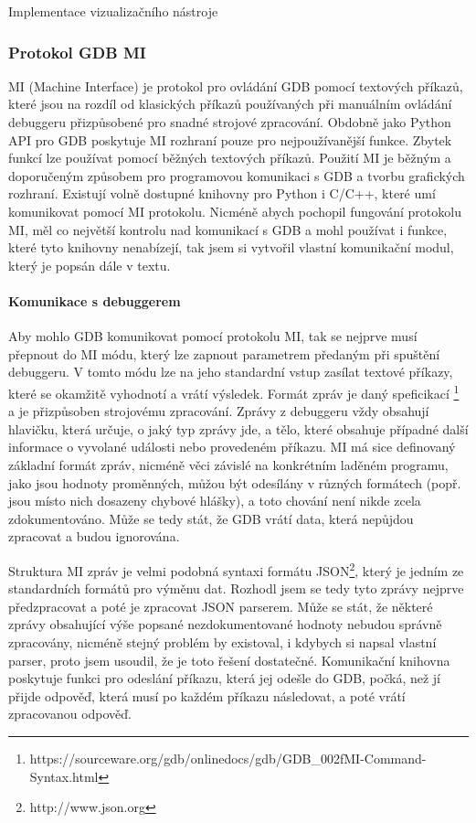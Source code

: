 \documentclass[czech,bachelor,male,python,dept460,hidelinks]{diploma}						%
\newcommand{\parspace}[1][]{
	\ifthenelse{\isempty{#1}}{\vspace{5mm}}{\vspace{#1}}
	\par
}
\begin{document}
\begin{section}{Implementace vizualizačního nástroje}
		\subsubsection{Protokol GDB MI}
		MI (Machine Interface) je protokol pro ovládání GDB pomocí textových příkazů, které jsou na rozdíl od klasických příkazů používaných při manuálním
		ovládání debuggeru přizpůsobené pro snadné strojové zpracování. Obdobně jako Python API pro GDB poskytuje MI rozhraní pouze pro nejpoužívanější funkce.
		Zbytek funkcí lze používat pomocí běžných textových příkazů. Použití MI je běžným a doporučeným \cite{gdb-mi-usage} způsobem pro programovou komunikaci
		s GDB a tvorbu grafických rozhraní. Existují volně dostupné knihovny pro Python i C/C++, které umí komunikovat pomocí MI protokolu.
		Nicméně abych pochopil fungování protokolu MI, měl co největší kontrolu nad komunikací s GDB a mohl používat i funkce, které tyto knihovny nenabízejí, tak
		jsem si vytvořil vlastní komunikační modul, který je popsán dále v textu.
		
		\paragraph*{Komunikace s debuggerem}
			Aby mohlo GDB komunikovat pomocí protokolu MI, tak se nejprve musí přepnout do MI módu, který lze zapnout parametrem předaným při spuštění debuggeru.
			V tomto módu lze na jeho standardní vstup zasílat textové příkazy, které se okamžitě vyhodnotí a vrátí výsledek. Formát zpráv je daný speficikací
			\footnote{https://sourceware.org/gdb/onlinedocs/gdb/GDB\_002fMI-Command-Syntax.html} a je přizpůsoben strojovému zpracování. Zprávy z debuggeru
			vždy obsahují hlavičku, která určuje, o jaký typ zprávy jde, a tělo, které obsahuje případné další informace o vyvolané události nebo
			provedeném příkazu. MI má sice definovaný základní formát zpráv, nicméně věci závislé na konkrétním laděném programu, jako jsou hodnoty proměnných,
			můžou být odesílány v různých formátech (popř. jsou místo nich dosazeny chybové hlášky), a toto chování není nikde zcela zdokumentováno.
			Může se tedy stát, že GDB vrátí data, která nepůjdou zpracovat a budou ignorována.
			
			\parspace Struktura MI zpráv je velmi podobná syntaxi formátu JSON\footnote{http://www.json.org}, který je jedním ze standardních formátů pro výměnu dat.
			Rozhodl jsem se tedy tyto zprávy nejprve předzpracovat a poté je zpracovat JSON parserem. Může se stát, že některé zprávy obsahující výše popsané 
			nezdokumentované hodnoty nebudou správně zpracovány, nicméně stejný problém by existoval, i kdybych si napsal vlastní parser, proto jsem usoudil, že je
			toto řešení dostatečné. Komunikační knihovna poskytuje funkci pro odeslání příkazu, která jej odešle do GDB, počká, než jí přijde odpověď, která musí po
			každém příkazu následovat, a poté vrátí zpracovanou odpověď.
			

\end{section}
\end{document}

